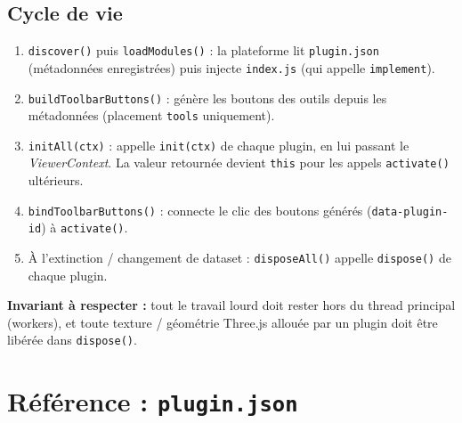 \documentclass[11pt,a4paper]{article}
\newcommand{\code}[1]{\texttt{#1}}
\newcommand{\filepath}[1]{\texttt{\small #1}}
\begin{document}
\subsection{Cycle de vie}

\begin{enumerate}[leftmargin=2em]
  \item \code{discover()} puis \code{loadModules()} : la plateforme lit
        \filepath{plugin.json} (métadonnées enregistrées) puis injecte
        \filepath{index.js} (qui appelle \code{implement}).
  \item \code{buildToolbarButtons()} : génère les boutons des outils depuis les
        métadonnées (placement \code{tools} uniquement).
  \item \code{initAll(ctx)} : appelle \code{init(ctx)} de chaque plugin, en lui
        passant le \emph{ViewerContext}. La valeur retournée devient
        \code{this} pour les appels \code{activate()} ultérieurs.
  \item \code{bindToolbarButtons()} : connecte le clic des boutons générés
        (\code{data-plugin-id}) à \code{activate()}.
  \item À l'extinction / changement de dataset : \code{disposeAll()} appelle
        \code{dispose()} de chaque plugin.
\end{enumerate}

\textbf{Invariant à respecter :} tout le travail lourd doit rester hors du thread
principal (workers), et toute texture / géométrie Three.js allouée par un plugin
doit être libérée dans \code{dispose()}.

\section{Référence : \filepath{plugin.json}}
\end{document}
